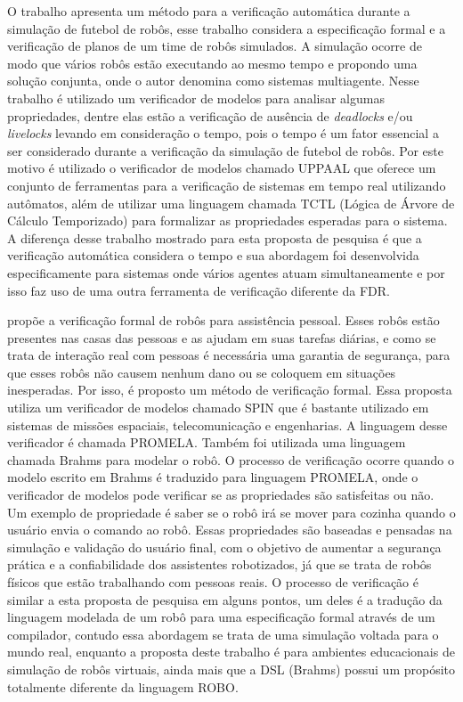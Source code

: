O trabalho \cite{silva} apresenta um método para a verificação automática durante a simulação de futebol de robôs, esse trabalho considera a especificação formal e a verificação de planos de um time de robôs simulados. A simulação ocorre de modo que vários robôs estão executando ao mesmo tempo e propondo uma solução conjunta, onde o autor denomina como sistemas multiagente. Nesse trabalho é utilizado um verificador de modelos para analisar algumas propriedades, dentre elas estão a verificação de ausência de \textit{deadlocks} e/ou \textit{livelocks} levando em consideração o tempo, pois o tempo é um fator essencial a ser considerado durante a verificação da simulação de futebol de robôs.  Por este motivo é utilizado o verificador de modelos chamado UPPAAL que oferece um conjunto de ferramentas para a verificação de sistemas em tempo real utilizando autômatos, além de utilizar uma linguagem chamada TCTL (Lógica de Árvore de Cálculo Temporizado) para formalizar as propriedades esperadas para o sistema. A diferença desse trabalho mostrado para esta proposta de pesquisa é que a verificação automática considera o tempo e sua abordagem foi desenvolvida especificamente para sistemas onde vários agentes atuam simultaneamente e por isso faz uso de uma outra ferramenta de verificação diferente da FDR.
	
 propõe a verificação formal de robôs para assistência pessoal. Esses robôs estão presentes nas casas das pessoas e as ajudam em suas tarefas diárias, e como se trata de interação real com pessoas é necessária uma garantia de segurança, para que esses robôs não causem nenhum dano ou se coloquem em situações inesperadas. Por isso, é proposto um método de verificação formal. Essa proposta utiliza um verificador de modelos chamado SPIN que é bastante utilizado em sistemas de missões espaciais, telecomunicação e engenharias. A linguagem desse verificador é chamada PROMELA. Também foi utilizada uma linguagem chamada Brahms para modelar o robô. O processo de verificação ocorre quando o modelo escrito em Brahms é traduzido para linguagem PROMELA, onde o verificador de modelos pode verificar se as propriedades são satisfeitas ou não. Um exemplo de propriedade é saber se o robô irá se mover para cozinha quando o usuário envia o comando ao robô.  Essas propriedades são baseadas e pensadas na simulação e validação do usuário final, com o objetivo de aumentar a segurança prática e a confiabilidade dos assistentes robotizados, já que se trata de robôs físicos que estão trabalhando com pessoas reais. O processo de verificação é similar a esta proposta de pesquisa em alguns pontos, um deles é a tradução da linguagem modelada de um robô para uma especificação formal através de um compilador, contudo essa abordagem se trata de uma simulação voltada para o mundo real, enquanto a proposta deste trabalho é para ambientes educacionais de simulação de robôs virtuais, ainda mais que a DSL (Brahms) possui um propósito totalmente diferente da linguagem ROBO.

